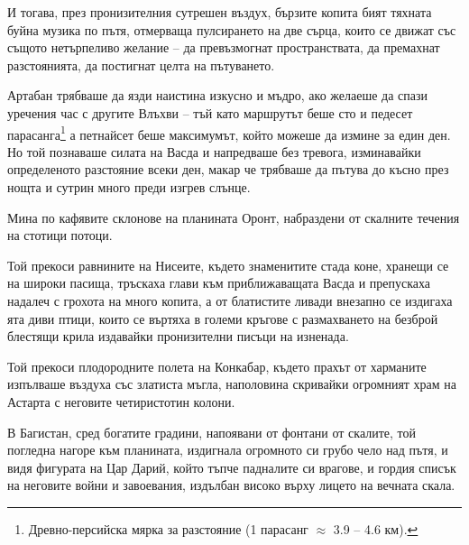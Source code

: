 И тогава, през пронизителния сутрешен въздух, бързите копита бият тяхната буйна
музика по пътя, отмерваща пулсирането на две сърца, които се движат със същото
нетърпеливо желание -- да превъзмогнат пространствата, да премахнат
разстоянията, да постигнат целта на пътуването.

Артабан трябваше да язди наистина изкусно и мъдро, ако желаеше да спази уречения
час с другите Влъхви -- тъй като маршрутът беше сто и педесет
парасанга\footnote{Древно-персийска мярка за разстояние (1 парасанг $\approx$
3.9 -- 4.6 км).} а петнайсет беше максимумът, който можеше да измине за един
ден. Но той познаваше силата на Васда и напредваше без тревога, изминавайки
определеното разстояние всеки ден, макар че трябваше да пътува до късно през
нощта и сутрин много преди изгрев слънце.

Мина по кафявите склонове на планината Оронт, набраздени от скалните течения
на стотици потоци.

Той прекоси равнините на Нисеите, където знаменитите стада коне, хранещи се на
широки пасища, тръскаха глави към приближаващата Васда и препускаха надалеч с
грохота на много копита, а от блатистите ливади внезапно се издигаха ята диви
птици, които се въртяха в големи кръгове с размахването на безброй блестящи
крила издавайки пронизителни писъци на изненада.

Той прекоси плодородните полета на Конкабар, където прахът от харманите
изпълваше въздуха със златиста мъгла, наполовина скривайки огромният храм на
Астарта с неговите четиристотин колони.

В Багистан, сред богатите градини, напоявани от фонтани от скалите, той погледна
нагоре към планината, издигнала огромното си грубо чело над пътя, и видя
фигурата на Цар Дарий, който тъпче падналите си врагове, и гордия списък на
неговите войни и завоевания, издълбан високо върху лицето на вечната скала.

